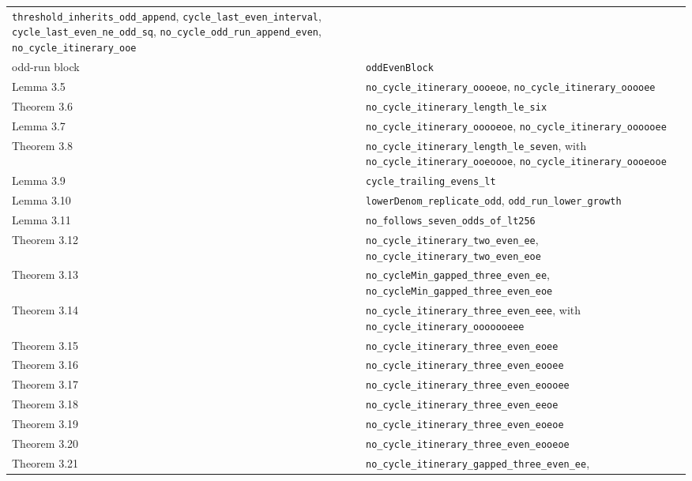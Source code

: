 \documentclass[12pt]{article}
\begin{document}
\begin{longtable}[]{@{}
  >{\raggedright\arraybackslash}p{}
  >{\raggedright\arraybackslash}p{}@{}}
\texttt{\nolinkurl{threshold_inherits_odd_append}},
\texttt{\nolinkurl{cycle_last_even_interval}},
\texttt{\nolinkurl{cycle_last_even_ne_odd_sq}},
\texttt{\nolinkurl{no_cycle_odd_run_append_even}},
\texttt{\nolinkurl{no_cycle_itinerary_ooe}} \\
odd-run block & \texttt{\nolinkurl{oddEvenBlock}} \\
Lemma 3.5 & \texttt{\nolinkurl{no_cycle_itinerary_oooeoe}},
\texttt{\nolinkurl{no_cycle_itinerary_ooooee}} \\
Theorem 3.6 & \texttt{\nolinkurl{no_cycle_itinerary_length_le_six}} \\
Lemma 3.7 & \texttt{\nolinkurl{no_cycle_itinerary_ooooeoe}},
\texttt{\nolinkurl{no_cycle_itinerary_oooooee}} \\
Theorem 3.8 & \texttt{\nolinkurl{no_cycle_itinerary_length_le_seven}},
with \texttt{\nolinkurl{no_cycle_itinerary_ooeoooe}},
\texttt{\nolinkurl{no_cycle_itinerary_oooeooe}} \\
Lemma 3.9 & \texttt{\nolinkurl{cycle_trailing_evens_lt}} \\
Lemma 3.10 & \texttt{\nolinkurl{lowerDenom_replicate_odd}},
\texttt{\nolinkurl{odd_run_lower_growth}} \\
Lemma 3.11 & \texttt{\nolinkurl{no_follows_seven_odds_of_lt256}} \\
Theorem 3.12 & \texttt{\nolinkurl{no_cycle_itinerary_two_even_ee}},
\texttt{\nolinkurl{no_cycle_itinerary_two_even_eoe}} \\
Theorem 3.13 & \texttt{\nolinkurl{no_cycleMin_gapped_three_even_ee}},
\texttt{\nolinkurl{no_cycleMin_gapped_three_even_eoe}} \\
Theorem 3.14 & \texttt{\nolinkurl{no_cycle_itinerary_three_even_eee}},
with \texttt{\nolinkurl{no_cycle_itinerary_ooooooeee}} \\
Theorem 3.15 &
\texttt{\nolinkurl{no_cycle_itinerary_three_even_eoee}} \\
Theorem 3.16 &
\texttt{\nolinkurl{no_cycle_itinerary_three_even_eooee}} \\
Theorem 3.17 &
\texttt{\nolinkurl{no_cycle_itinerary_three_even_eoooee}} \\
Theorem 3.18 &
\texttt{\nolinkurl{no_cycle_itinerary_three_even_eeoe}} \\
Theorem 3.19 &
\texttt{\nolinkurl{no_cycle_itinerary_three_even_eoeoe}} \\
Theorem 3.20 &
\texttt{\nolinkurl{no_cycle_itinerary_three_even_eooeoe}} \\
Theorem 3.21 &
\texttt{\nolinkurl{no_cycle_itinerary_gapped_three_even_ee}},

\end{longtable}
\end{document}
